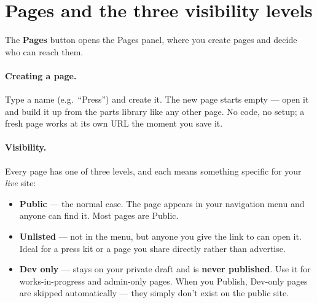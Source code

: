 \documentclass[11pt]{article}
\begin{document}
\section{Pages and the three visibility levels}\label{sec:pages}

The \textbf{Pages} button opens the Pages panel, where you create pages and decide
who can reach them.

\paragraph{Creating a page.} Type a name (e.g.\ ``Press'') and create it. The new page
starts empty --- open it and build it up from the parts library like any other page.
No code, no setup; a fresh page works at its own URL the moment you save it.

\paragraph{Visibility.} Every page has one of three levels, and each means something
specific for your \emph{live} site:

\begin{center}
\end{center}

\begin{itemize}[leftmargin=*]
  \item \textbf{Public} --- the normal case. The page appears in your navigation menu
    and anyone can find it. Most pages are Public.
  \item \textbf{Unlisted} --- not in the menu, but anyone you give the link to can open
    it. Ideal for a press kit or a page you share directly rather than advertise.
  \item \textbf{Dev only} --- stays on your private draft and is \textbf{never
    published}. Use it for works-in-progress and admin-only pages. When you Publish,
    Dev-only pages are skipped automatically --- they simply don't exist on the public
    site.
\end{itemize}
\end{document}

